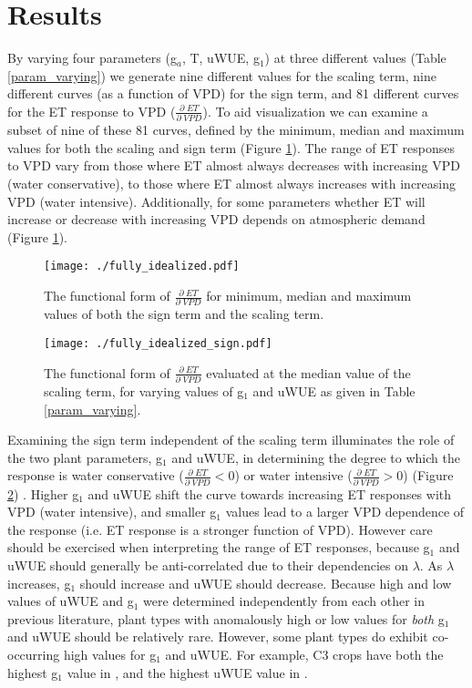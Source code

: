 \documentclass[12pt]{article}
\begin{document}
\section{Results}
\label{results}

By varying four parameters (g$_a$, T, uWUE, g$_1$) at three different
values (Table \ref{param_varying}) we generate nine different values
for the scaling term, nine different curves (as a function of VPD) for
the sign term, and 81 different curves for the ET response to VPD
($\frac{\partial \; ET}{\partial \; VPD}$). To aid visualization we
can examine a subset of nine of these 81 curves, defined by the
minimum, median and maximum values for both the scaling and sign term
(Figure \ref{full}). The range of ET responses to VPD vary from those
where ET almost always decreases with increasing VPD (water
conservative), to those where ET almost always increases with
increasing VPD (water intensive). Additionally, for some parameters
whether ET will increase or decrease with increasing VPD depends on
atmospheric demand (Figure \ref{full}).

\begin{figure}
  \centering \texttt{[image: ./fully\_idealized.pdf]}
  \caption{The functional form of $\frac{\partial \; ET}{\partial
      \; VPD}$ for minimum, median and maximum values of both the sign
    term and the scaling term.}
  \label{full}
\end{figure}

\begin{figure}
  \centering \texttt{[image: ./fully\_idealized\_sign.pdf]}
  \caption{The functional form of $\frac{\partial \; ET}{\partial
      \; VPD}$ evaluated at the median value of the scaling term, for
    varying values of g$_1$ and uWUE as given in Table \ref{param_varying}.}
  \label{sign}
\end{figure}

Examining the sign term independent of the scaling term illuminates
the role of the two plant parameters, g$_1$ and uWUE, in determining
the degree to which the response is water conservative
($\frac{\partial \; ET}{\partial \; VPD} < 0$) or water intensive
($\frac{\partial \; ET}{\partial \; VPD} > 0$) (Figure \ref{sign})
. Higher g$_1$ and uWUE shift the curve towards increasing ET
responses with VPD (water intensive), and smaller g$_1$ values lead to
a larger VPD dependence of the response (i.e. ET response is a
stronger function of VPD). However care should be exercised when
interpreting the range of ET responses, because g$_1$ and uWUE should
generally be anti-correlated due to their dependencies on
$\lambda$. As $\lambda$ increases, g$_1$ should increase and uWUE
should decrease. Because high and low values of uWUE and g$_1$ were
determined independently from each other in previous literature, plant
types with anomalously high or low values for \textit{both} g$_1$ and
uWUE should be relatively rare. However, some plant types do exhibit
co-occurring high values for g$_1$ and uWUE. For example, C3 crops
have both the highest g$_1$ value in , and the
highest uWUE value in .
\end{document}
